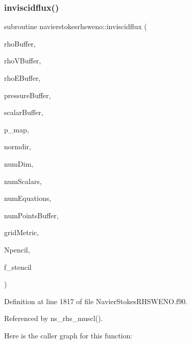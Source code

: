 \subsubsection{\texorpdfstring{inviscidflux()}{inviscidflux()}}
{\footnotesize\ttfamily subroutine navierstokesrhsweno\+::inviscidflux (\begin{DoxyParamCaption}\item[{real(kind=8), dimension(numpointsbuffer), intent(in)}]{rho\+Buffer,  }\item[{real(kind=8), dimension(numdim$\ast$numpointsbuffer), intent(in), target}]{rho\+V\+Buffer,  }\item[{real(kind=8), dimension(numpointsbuffer), intent(in)}]{rho\+E\+Buffer,  }\item[{real(kind=8), dimension(numpointsbuffer), intent(in)}]{pressure\+Buffer,  }\item[{real(kind=8), dimension(numscalars$\ast$numpointsbuffer), intent(in), target}]{scalar\+Buffer,  }\item[{integer(kind=8), dimension(\+:), intent(in)}]{p\+\_\+map,  }\item[{integer(kind=4)}]{normdir,  }\item[{integer(kind=4)}]{num\+Dim,  }\item[{integer(kind=4)}]{num\+Scalars,  }\item[{integer(kind=4)}]{num\+Equations,  }\item[{integer(kind=8)}]{num\+Points\+Buffer,  }\item[{real(kind=8), dimension(numdim$\ast$numdim$\ast$numpointsbuffer), intent(in)}]{grid\+Metric,  }\item[{integer(kind=4)}]{Npencil,  }\item[{real(kind=8), dimension(npencil,numequations), intent(out)}]{f\+\_\+stencil }\end{DoxyParamCaption})}



Definition at line 1817 of file Navier\+Stokes\+R\+H\+S\+W\+E\+N\+O.\+f90.



Referenced by ns\+\_\+rhs\+\_\+muscl().

Here is the caller graph for this function\+:
\hypertarget{namespacenavierstokesrhsweno_a55d470cff0a999fd7c1394776ce8153a}{}\label{namespacenavierstokesrhsweno_a55d470cff0a999fd7c1394776ce8153a} 
